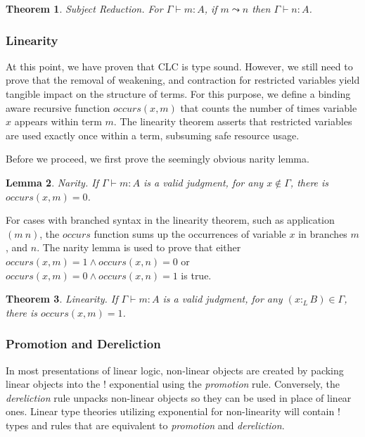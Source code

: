 \documentclass[sigplan,screen,review,authordraft]{acmart}
\newtheorem{theorem}{Theorem}[section]
\newtheorem{lemma}[theorem]{Lemma}
\theoremstyle{definition}
\newcommand{\ltype}{:_{\scriptscriptstyle L}}
\newcommand{\pstep}{\leadsto}
\begin{document}
  \begin{theorem} 
    Subject Reduction. For $\Gamma \vdash m : A$, if $m \pstep n$ then $\Gamma \vdash n : A$.
  \end{theorem}

  \subsubsection{Linearity}
  At this point, we have proven that CLC is type sound. However, we still need to prove that the removal of weakening, and contraction for restricted variables yield tangible impact on the structure of terms. For this purpose, we define a binding aware recursive function $occurs(x, m)$ that counts the number of times variable $x$ appears within term $m$. The linearity theorem asserts that restricted variables are used exactly once within a term, subsuming safe resource usage.

  Before we proceed, we first prove the seemingly obvious narity lemma. 

  \begin{lemma} 
    Narity. If $\Gamma \vdash m : A$ is a valid judgment, for any $x \notin \Gamma$, there is $occurs(x, m) = 0$.
  \end{lemma}

  For cases with branched syntax in the linearity theorem, such as application $(m\ n)$, the $occurs$ function sums up the occurrences of variable $x$ in branches $m$, and $n$. The narity lemma is used to prove that either $occurs(x, m) = 1 \wedge occurs(x, n) = 0$ or $occurs(x, m) = 0 \wedge occurs(x, n) = 1$ is true.

  \begin{theorem} 
    Linearity. If $\Gamma \vdash m : A$ is a valid judgment, for any $(x \ltype B) \in \Gamma$, there is $occurs(x, m) = 1$.
  \end{theorem}

  \subsubsection{Promotion and Dereliction}
  In most presentations of linear logic, non-linear objects are created by packing linear objects into the ! exponential using the \textit{promotion} rule. Conversely, the \textit{dereliction} rule unpacks non-linear objects so they can be used in place of linear ones. Linear type theories \cite{abramsky1993,dill,vakar14} utilizing exponential for non-linearity will contain ! types and rules that are equivalent to \textit{promotion} and \textit{dereliction}.
\end{document}
